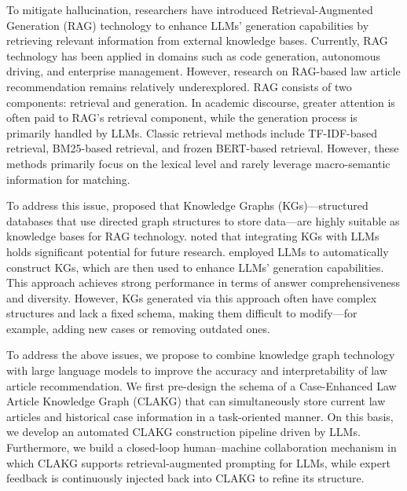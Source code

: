\documentclass[review,times,nonatbib]{elsarticle} %
\renewcommand{\textcolor}[2]{#2}
\begin{document}
To mitigate \textcolor{blue}{hallucination}, researchers \textcolor{blue}{have introduced} Retrieval-Augmented Generation (RAG) technology to enhance \textcolor{blue}{LLMs’ generation capabilities} \textcolor{blue}{by} retrieving relevant information from external knowledge bases\cite{lewis2020retrieval, cai2022recent}. Currently, RAG technology has been applied in \textcolor{blue}{domains} such as code generation\cite{gou2024rrgcode}, autonomous driving\cite{dai2024vistarag}, and enterprise management\cite{oleary2024rise}. However, research on \textcolor{blue}{RAG-based} law article recommendation remains relatively underexplored. RAG \textcolor{blue}{consists of} two \textcolor{blue}{components}: retrieval and generation. In \textcolor{blue}{academic discourse}, greater attention is often \textcolor{blue}{paid to} \textcolor{blue}{RAG’s} retrieval component, \textcolor{blue}{while} the generation process is \textcolor{blue}{primarily} handled by LLMs. Classic retrieval methods include \textcolor{blue}{TF-IDF}-based retrieval\cite{aizawa2003information}, BM25-based retrieval\cite{robertson2009probabilistic}, and \textcolor{blue}{frozen BERT-based} retrieval\cite{borgeaud2022improving}. However, \textcolor{blue}{these} methods \textcolor{blue}{primarily} focus on the \textcolor{blue}{lexical} level and rarely \textcolor{blue}{leverage macro-semantic information} for matching.

To \textcolor{blue}{address this issue}, \textcite{chaudhri2022knowledge} proposed that \textcolor{blue}{Knowledge Graphs (KGs)—structured databases that use directed graph structures to store data}—are highly suitable \textcolor{blue}{as knowledge bases} for RAG technology. \textcite{pan2024unifying} \textcolor{blue}{noted that integrating} KGs with LLMs \textcolor{blue}{holds significant potential for} future research. \textcite{edge2024from} \textcolor{blue}{employed} LLMs to automatically construct \textcolor{blue}{KGs}, which are then used to enhance \textcolor{blue}{LLMs’ generation capabilities}. \textcolor{blue}{This approach achieves strong performance in terms of} answer comprehensiveness and diversity. However, KGs generated \textcolor{blue}{via} this \textcolor{blue}{approach} often have complex structures and lack a fixed schema, making them difficult to modify—\textcolor{blue}{for example, adding new cases or removing outdated ones}.

\textcolor{blue}{To address the above issues, we propose to combine knowledge graph technology with large language models to improve the accuracy and interpretability of law article recommendation. We first pre-design the schema of a Case-Enhanced Law Article Knowledge Graph (CLAKG) that can simultaneously store current law articles and historical case information in a task-oriented manner. On this basis, we develop an automated CLAKG construction pipeline driven by LLMs. Furthermore, we build a closed-loop human–machine collaboration mechanism in which CLAKG supports retrieval-augmented prompting for LLMs, while expert feedback is continuously injected back into CLAKG to refine its structure.}
\end{document}
